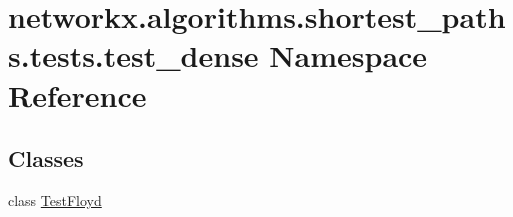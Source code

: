\hypertarget{namespacenetworkx_1_1algorithms_1_1shortest__paths_1_1tests_1_1test__dense}{}\section{networkx.\+algorithms.\+shortest\+\_\+paths.\+tests.\+test\+\_\+dense Namespace Reference}
\label{namespacenetworkx_1_1algorithms_1_1shortest__paths_1_1tests_1_1test__dense}
\subsection*{Classes}
\begin{DoxyCompactItemize}
\item 
class \hyperlink{classnetworkx_1_1algorithms_1_1shortest__paths_1_1tests_1_1test__dense_1_1TestFloyd}{Test\+Floyd}
\end{DoxyCompactItemize}
